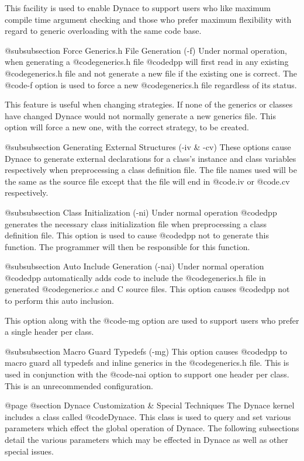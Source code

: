 This facility is used to enable Dynace to support users who like
maximum compile time argument checking and those who prefer maximum
flexibility with regard to generic overloading with the same code
base.

@subsubsection Force Generics.h File Generation (-f)
Under normal operation, when generating a @code{generics.h} file
@code{dpp} will first read in any existing @code{generics.h} file
and not generate a new file if the existing one is correct.  The
@code{-f} option is used to force a new @code{generics.h} file
regardless of its status.

This feature is useful when changing strategies.  If none of the generics
or classes have changed Dynace would not normally generate a new generics
file.  This option will force a new one, with the correct strategy, to
be created.

@subsubsection Generating External Structures (-iv & -cv)
These options cause Dynace to generate external declarations for
a class's instance and class variables respectively when preprocessing
a class definition file.  The file names used will be the same as
the source file except that the file will end in @code{.iv} or
@code{.cv} respectively.

@subsubsection Class Initialization (-ni)
Under normal operation @code{dpp} generates the necessary class
initialization file when preprocessing a class definition file.
This option is used to cause @code{dpp} not to generate this
function.  The programmer will then be responsible for this
function.

@subsubsection Auto Include Generation (-nai)
Under normal operation @code{dpp} automatically adds code to include the
@code{generics.h} file in generated @code{generics.c} and C source
files.  This option causes @code{dpp} not to perform this auto inclusion.

This option along with the @code{-mg} option are used to support
users who prefer a single header per class.

@subsubsection Macro Guard Typedefs (-mg)
This option causes @code{dpp} to macro guard all typedefs and inline
generics in the @code{generics.h} file.  This is used in conjunction
with the @code{-nai} option to support one header per class.  This is an
unrecommended configuration.


@page
@section Dynace Customization & Special Techniques
The Dynace kernel includes a class called @code{Dynace}.  This class is used
to query and set various parameters which effect the global operation
of Dynace.  The following subsections detail the various parameters which
may be effected in Dynace as well as other special issues.

